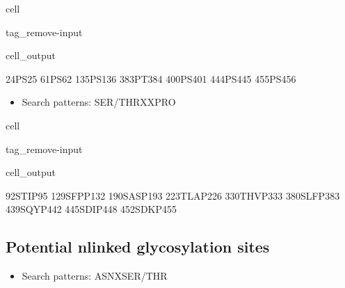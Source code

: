 \documentclass[letterpaper,10pt,english]{jupyterBook}
\begin{document}
\begin{sphinxuseclass}{cell}
\begin{sphinxuseclass}{tag_remove-input}\begin{sphinxVerbatimOutput}

\begin{sphinxuseclass}{cell_output}
\begin{sphinxVerbatim}[commandchars=\\\{\}]
24\PYGZhy{}PS\PYGZhy{}25
61\PYGZhy{}PS\PYGZhy{}62
135\PYGZhy{}PS\PYGZhy{}136
383\PYGZhy{}PT\PYGZhy{}384
400\PYGZhy{}PS\PYGZhy{}401
444\PYGZhy{}PS\PYGZhy{}445
455\PYGZhy{}PS\PYGZhy{}456
\end{sphinxVerbatim}

\end{sphinxuseclass}\end{sphinxVerbatimOutput}

\end{sphinxuseclass}
\end{sphinxuseclass}\begin{itemize}
\item {} 
\sphinxAtStartPar
Search patterns: SER/THR\sphinxhyphen{}X\sphinxhyphen{}X\sphinxhyphen{}PRO

\end{itemize}

\begin{sphinxuseclass}{cell}
\begin{sphinxuseclass}{tag_remove-input}\begin{sphinxVerbatimOutput}

\begin{sphinxuseclass}{cell_output}
\begin{sphinxVerbatim}[commandchars=\\\{\}]
92\PYGZhy{}STIP\PYGZhy{}95
129\PYGZhy{}SFPP\PYGZhy{}132
190\PYGZhy{}SASP\PYGZhy{}193
223\PYGZhy{}TLAP\PYGZhy{}226
330\PYGZhy{}THVP\PYGZhy{}333
380\PYGZhy{}SLFP\PYGZhy{}383
439\PYGZhy{}SQYP\PYGZhy{}442
445\PYGZhy{}SDIP\PYGZhy{}448
452\PYGZhy{}SDKP\PYGZhy{}455
\end{sphinxVerbatim}

\end{sphinxuseclass}\end{sphinxVerbatimOutput}

\end{sphinxuseclass}
\end{sphinxuseclass}

\subsection{Potential n\sphinxhyphen{}linked glycosylation sites}
\label{\detokenize{ipynb/chapter1:potential-n-linked-glycosylation-sites}}\begin{itemize}
\item {} 
\sphinxAtStartPar
Search patterns: ASN\sphinxhyphen{}X\sphinxhyphen{}SER/THR

\end{itemize}
\end{document}
